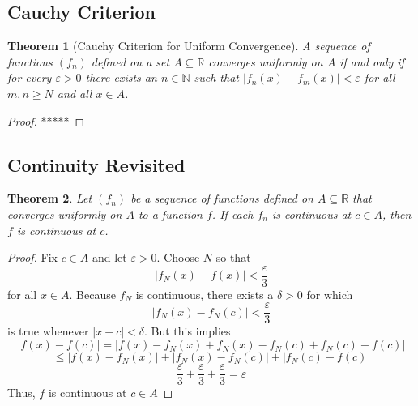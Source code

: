 \documentclass[10pt]{report}
\newtheorem{thm3}{Theorem}[subsection]
\newcommand{\eps}{\varepsilon}
\begin{document}
\subsection{Cauchy Criterion}
\begin{thm3}[Cauchy Criterion for Uniform Convergence]
A sequence of functions $(f_n)$ defined on a set $A\subseteq\mathbb{R}$ converges uniformly on $A$ if and only if for every $\eps>0$ there exists an $n\in\mathbb{N}$ such that $|f_n(x)-f_m(x)|<\eps$ for all $m,n\geq N$ and all $x\in A$.
\end{thm3}
\begin{proof}
*****
\end{proof}
\subsection{Continuity Revisited}
\begin{thm3}
Let $(f_n)$ be a sequence of functions defined on $A\subseteq\mathbb{R}$ that converges uniformly on $A$ to a function $f$. If each $f_n$ is continuous at $c\in A$, then $f$ is continuous at $c$.
\end{thm3}
\begin{proof}
Fix $c\in A$ and let $\eps>0$. Choose $N$ so that
$$|f_N(x)-f(x)|<\frac{\eps}{3}$$
for all $x\in A$. Because $f_N$ is continuous, there exists a $\delta>0$ for which
$$|f_N(x)-f_N(c)|<\frac{\eps}{3}$$
is true whenever $|x-c|<\delta$. But this implies
$$|f(x)-f(c)| = |f(x) - f_N(x)+f_N(x)-f_N(c)+f_N(c)-f(c)|$$
$$\leq |f(x)-f_N(x)| + |f_N(x)-f_N(c)| + |f_N(c)-f(c)|$$
$$\frac{\eps}{3} + \frac{\eps}{3} + \frac{\eps}{3} = \eps$$
Thus, $f$ is continuous at $c\in A$
\end{proof}
\end{document}
